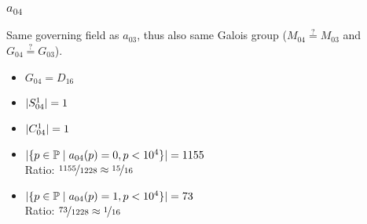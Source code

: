 \subsubsection{$a_{04}$}
Same governing field as $a_{03}$, thus also same Galois group ($M_{04} \stackrel{?}{=} M_{03}$ and $G_{04} \stackrel{?}{=} G_{03}$).
\begin{multicols}{2}
	\begin{itemize}
		\item $G_{04} = D_{16}$
		\item $| S_{04}^1 | = 1$
		\item $| C_{04}^1 | = 1$
	\end{itemize}
	\begin{itemize}
		\item $| \{ p \in \mathbb{P} \mid a_{04}(p)=0, p<10^4 \} | = 1155$\\
		Ratio: $\nicefrac{ 1155 }{ 1228 } \approx \nicefrac{ 15 }{ 16 }$
		\item $| \{ p \in \mathbb{P} \mid a_{04}(p)=1, p<10^4 \} | = 73$\\
		Ratio: $\nicefrac{ 73 }{ 1228 } \approx \nicefrac{ 1 }{ 16 }$
	\end{itemize}
\end{multicols}

